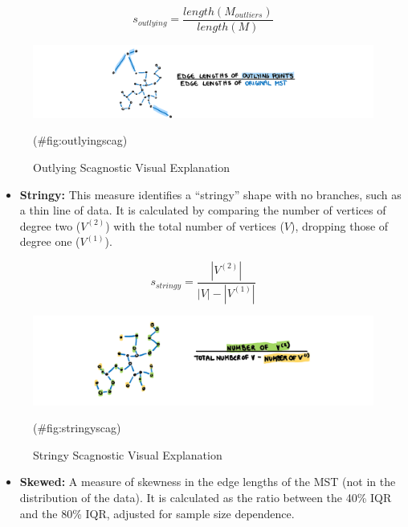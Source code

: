 \[s_{outlying}=\frac{length(M_{outliers})}{length(M)}\]

\begin{Schunk}
\begin{figure}
\includegraphics[width=1\linewidth,height=0.2\textheight]{figures/drawoutlying} \caption[Outlying Scagnostic Visual Explanation]{Outlying Scagnostic Visual Explanation}(\#fig:outlyingscag)
\end{figure}
\end{Schunk}

\begin{itemize}
\tightlist
\item
  \textbf{Stringy:} This measure identifies a ``stringy'' shape with no
  branches, such as a thin line of data. It is calculated by comparing
  the number of vertices of degree two (\(V^{(2)}\)) with the total
  number of vertices (\(V\)), dropping those of degree one
  (\(V^{(1)}\)).
\end{itemize}

\[s_{stringy} = \frac{|V^{(2)}|}{|V|-|V^{(1)}|}\]

\begin{Schunk}
\begin{figure}
\includegraphics[width=1\linewidth,height=0.2\textheight]{figures/drawstringy} \caption[Stringy Scagnostic Visual Explanation]{Stringy Scagnostic Visual Explanation}(\#fig:stringyscag)
\end{figure}
\end{Schunk}

\begin{itemize}
\tightlist
\item
  \textbf{Skewed:} A measure of skewness in the edge lengths of the MST
  (not in the distribution of the data). It is calculated as the ratio
  between the 40\% IQR and the 80\% IQR, adjusted for sample size
  dependence.
\end{itemize}

